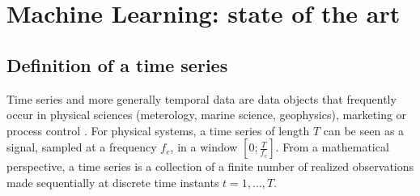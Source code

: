 \chapter{Machine Learning: state of the art}
\label{chap:premierchapitre}
\minitoc




\section{Definition of a time series}
Time series and more generally temporal data are data objects that frequently occur in physical sciences (meterology, marine science, geophysics), marketing or process control \cite{Chatfield2004}. For physical systems, a time series of length $T$ can be seen as a signal, sampled at a frequency $f_e$, in a window $[0;\frac{T}{f_e}]$. From a mathematical perspective, a time series is a collection of a finite number of realized observations made sequentially at discrete time instants $t=1,...,T$. 

